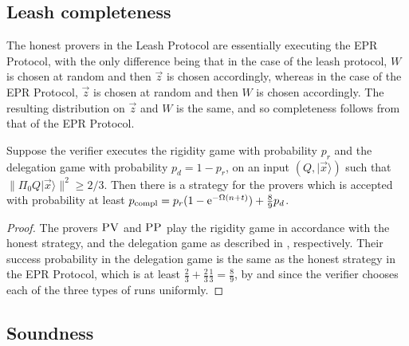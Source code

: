 \documentclass{toc}
\newcommand{\ket}[1]{|#1\rangle}
\DeclareMathOperator{\compl}{compl}
\newcommand{\pv}{\textsc{PV}}
\newcommand{\pp}{\textsc{PP}}
\begin{document}
\subsection{Leash completeness}   %

The honest provers in the Leash Protocol are essentially executing the EPR Protocol, with the only difference being that in the case of the leash protocol, $W$ is chosen at random and then $\vec{z}$ is chosen accordingly, whereas in the case of the EPR Protocol, $\vec{z}$ is chosen at random and then $W$ is chosen accordingly. The resulting distribution on $\vec{z}$ and $W$ is the same, and so completeness follows from that of the EPR Protocol.

\begin{lemma}\label{lem:leash-completeness}
Suppose the verifier executes the rigidity game with probability $p_r$ and the delegation game with probability $p_d=1-p_r$, on an input $(Q,\ket{\vec{x}})$ such that $\|\Pi_0 Q \ket{\vec{x}}\|^2 \geq 2/3$. Then there is a strategy for the provers which is accepted with probability at least $p_{\compl} = p_r(1-\eee^{-\Omega(n+t)}) + \frac{8}{9}p_d$. 
\end{lemma}

\begin{proof}
The provers $\pv$ and $\pp$ play the rigidity game 
in accordance with %
the honest strategy, and the delegation game as described in  ,
 respectively. Their success probability in the delegation game is the same as the honest strategy in the EPR Protocol, which is at least $\frac{2}{3}+\frac{2}{3}\frac{1}{3}=\frac{8}{9}$, by  and since the verifier chooses each of the three types of runs uniformly.
\end{proof}


\subsection{Soundness}   %
\end{document}
